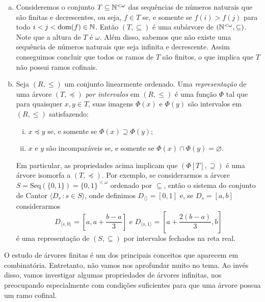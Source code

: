 \documentclass[a4paper]{article}
\begin{document}
\begin{exemplo}
\begin{enumerate}[(a)]
   \item Consideremos o conjunto
    \(T\subseteq \mathbb{N}^{<\omega}\)
     das sequências de números naturais que são finitas e
    decrescentes, ou seja, \(f\in T \) se, e somente se  \(f(i)>f(j)\)  para todo
    \(i<j<\operatorname{dom}(f)\in\mathbb{N}\).  Então \((T,\subseteq)\) é uma subárvore de
    \((\mathbb{N}^{<\omega},\subseteq)\). Note que a altura de  \(T\) é 
    \(\omega\). Além disso, sabemos que não
    existe uma sequência de números naturais que seja infinita e decrescente.
    Assim conseguimos concluir que todos os ramos de \(T\) são finitos, o
    que implica que \(T\) não possui ramos cofinais.

  \item Seja \((R,\leq)\) um conjunto linearmente ordenado.
    Uma \emph{representação} de uma árvore \((T,\preceq)\)
    \emph{por intervalos} em \((R,\leq)\) é uma função \(\Phi\) tal que para
    quaisquer \(x,y\in T\),
    suas imagens \(\Phi(x)\) e \(\Phi(y)\) são intervalos em \((R,\leq)\) satisfazendo:
    \begin{enumerate}[(i)]
    \item \(x\preceq y\) se, e somente se \(\Phi(x)\supseteq\Phi(y)\); 
    \item \(x\) e \(y\) são incomparáveis se, e somente se \(\Phi(x)\cap\Phi(y) =\varnothing\).
    \end{enumerate}
    Em particular, as propriedades acima implicam que \((\Phi[T],\supseteq)\) é
    uma árvore isomorfa a \((T,\preceq)\). Por exemplo, se considerarmos
    a árvore \(S=\text{Seq}(\{0,1\})=\{0,1\}^{<\omega}\) ordenado por \(\subseteq\),
    então o sistema do conjunto de Cantor \(\langle D_s \,\colon s\in
    S\rangle\), onde definimos \(D_{\langle\rangle}=[0,1]\) e, se
    \(D_{s}=[a,b]\) considerarmos
    \begin{equation*}
        D_{\langle s,0\rangle}=[a,a+\frac{b-a}{3}]\text{ e }
        D_{\langle s,1\rangle}=[a+\frac{2(b-a)}{3},b]
 \end{equation*}é uma representação de
    \((S,\subseteq)\) por intervalos fechados na reta real.
    \end{enumerate}
  \end{exemplo}
  
  O estudo de árvores finitas é um dos  principais conceitos que aparecem em
  combinatória. Entretanto, não vamos nos aprofundar muito no tema. Ao invés
  disso, vamos investigar algumas propriedades de árvores infinitas, nos preocupando
  especialmente com condições suficientes para que uma árvore possua um ramo cofinal.
\end{document}
